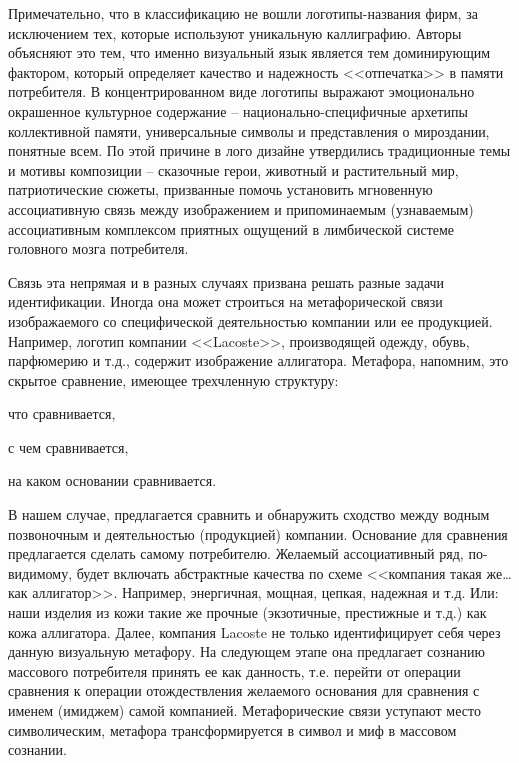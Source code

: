 Примечательно, что в классификацию не вошли логотипы-названия фирм, за исключением
тех, которые используют уникальную каллиграфию. Авторы объясняют это тем,
что именно визуальный язык является тем доминирующим фактором, который определяет
качество и надежность <<отпечатка>> в памяти потребителя. В концентрированном виде
логотипы выражают эмоционально окрашенное культурное содержание --
национально-специфичные архетипы коллективной памяти, универсальные символы и
представления о мироздании, понятные всем. По этой причине в лого дизайне
утвердились традиционные темы и мотивы композиции -- сказочные герои, животный
и растительный мир, патриотические сюжеты, призванные помочь установить мгновенную
ассоциативную связь между изображением и припоминаемым (узнаваемым) ассоциативным
комплексом приятных ощущений в лимбической системе головного мозга потребителя.

Связь эта непрямая и в разных случаях призвана решать разные задачи идентификации.
Иногда она может строиться на метафорической связи изображаемого со специфической
деятельностью компании или ее продукцией. Например, логотип компании <<Lacoste>>,
производящей одежду, обувь, парфюмерию и т.д., содержит изображение аллигатора.
Метафора, напомним, это скрытое сравнение, имеющее трехчленную структуру:
\begin{enumerate*}[label=\asbuk*)]
    \item что сравнивается,
    \item с чем сравнивается,
    \item на каком основании сравнивается.
\end{enumerate*}
В нашем случае, предлагается сравнить и обнаружить сходство между водным
позвоночным и деятельностью (продукцией) компании. Основание для сравнения
предлагается сделать самому потребителю. Желаемый ассоциативный ряд, по-видимому,
будет включать абстрактные качества по схеме <<компания такая же\ldots как аллигатор>>.
Например, энергичная, мощная, цепкая, надежная и т.д. Или: наши изделия из
кожи такие же прочные (экзотичные, престижные и т.д.) как кожа аллигатора. Далее,
компания Lacoste не только идентифицирует себя через данную визуальную метафору.
На следующем этапе она предлагает сознанию массового потребителя принять ее
как данность, т.е. перейти от операции сравнения к операции отождествления
желаемого основания для сравнения с именем (имиджем) самой компанией. Метафорические
связи уступают место символическим, метафора трансформируется в символ и миф в
массовом сознании.

